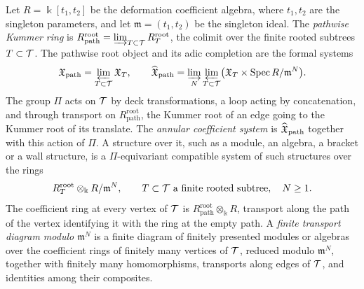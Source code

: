 \begin{definition}\label{def:pathwise-root-object}
Let $R=\Bbbk[t_1,t_2]$ be the deformation coefficient algebra, where
$t_1,t_2$ are the singleton parameters, and let $\mathfrak m=(t_1,t_2)$ be the
singleton ideal.  The \emph{pathwise Kummer ring} is
$R_{\mathrm{path}}^{\mathrm{root}}=\varinjlim_{T\subset\mathcal T}R_T^{\mathrm{root}}$,
the colimit over the finite rooted subtrees $T\subset\mathcal T$.
The pathwise root object and its adic completion are the formal systems
\begin{equation}\label{eq:pathwise-root-object}
 \mathfrak X_{\mathrm{path}}=\varprojlim_{T\subset\mathcal T}\mathfrak X_T,
 \qquad
 \widehat{\mathfrak X}_{\mathrm{path}}
 =\varinjlim_N\varprojlim_{T\subset\mathcal T}
  \bigl(\mathfrak X_T\times\operatorname{Spec} R/\mathfrak m^N\bigr).
\end{equation}
The group $\Pi$ acts on $\mathcal T$ by deck transformations, a loop acting by
concatenation, and through transport on $R_{\mathrm{path}}^{\mathrm{root}}$,
the Kummer root of an edge going to the Kummer root of its translate.  The
\emph{annular coefficient system} is $\widehat{\mathfrak X}_{\mathrm{path}}$
together with this action of $\Pi$.  A structure over it, such as a module,
an algebra, a bracket or a wall structure, is a $\Pi$-equivariant compatible
system of such structures over the rings
\begin{equation}\label{eq:annular-root-object}
 R_T^{\mathrm{root}}\otimes_\Bbbk R/\mathfrak m^N,
 \qquad T\subset\mathcal T\ \text{a finite rooted subtree},\quad N\geq1.
\end{equation}
The coefficient ring at every vertex of $\mathcal T$ is
$R_{\mathrm{path}}^{\mathrm{root}}\otimes_\Bbbk R$, transport along the path
of the vertex identifying it with the ring at the empty path.  A
\emph{finite transport diagram modulo $\mathfrak m^N$} is a finite diagram of
finitely presented modules or algebras over the coefficient rings of
finitely many vertices of $\mathcal T$, reduced modulo $\mathfrak m^N$, together with
finitely many homomorphisms, transports along edges of $\mathcal T$, and
identities among their composites.
\end{definition}

